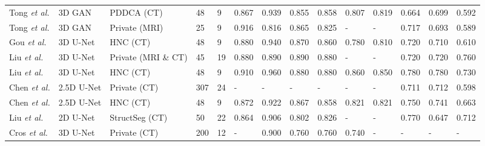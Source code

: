 \documentclass[lettersize,journal]{IEEEtran}
\begin{document}
{\begin{table*}[ht!]
{\begin{tabular}{@{}llllllllllllll@{}}
Tong {\it{et al.}} \cite{41}                     & 3D GAN                    & PDDCA (CT) \cite{30}   & 48       & 9          & 0.867     & 0.939    & 0.855           & 0.858           & 0.807              & 0.819              & 0.664          & 0.699          & 0.592  \\
Tong {\it{et al.}} \cite{41}                     & 3D GAN                    & Private (MRI)         & 25       & 9          & 0.916     & 0.816    & 0.865           & 0.825           & -                  & -                  & 0.717          & 0.693          & 0.589  \\
Gou {\it{et al.}} \cite{42}                       & 3D U-Net                  & HNC (CT) \cite{30}     & 48       & 9          & 0.880     & 0.940    & 0.870           & 0.860           & 0.780              & 0.810              & 0.720          & 0.710          & 0.610  \\
Liu {\it{et al.}} \cite{43}                       & 3D U-Net                  & Private (MRI \& CT)   & 45       & 19         & 0.880     & 0.890    & 0.890           & 0.880           & -                  & -                  & 0.720          & 0.720          & 0.760  \\
Liu {\it{et al.}} \cite{43}                       & 3D U-Net                  & HNC (CT) \cite{30}     & 48       & 9          & 0.910     & 0.960    & 0.880           & 0.880           & 0.860              & 0.850              & 0.780          & 0.780          & 0.730  \\
Chen {\it{et al.}} \cite{44}                     & 2.5D U-Net                & Private (CT)          & 307      & 24         & -         & -        & -               & -               & -                  & -                  & 0.711          & 0.712          & 0.598  \\
Chen {\it{et al.}} \cite{44}                      & 2.5D U-Net                & HNC (CT) \cite{30}     & 48       & 9          & 0.872     & 0.922    & 0.867           & 0.858           & 0.821              & 0.821              & 0.750          & 0.741          & 0.663  \\
Liu {\it{et al.}} \cite{45}                      & 2D U-Net                  & StructSeg (CT)        & 50       & 22         & 0.864     & 0.906    & 0.802           & 0.826           & -                  & -                  & 0.770          & 0.647          & 0.712  \\
Cros {\it{et al.}} \cite{46}                     & 3D U-Net                  & Private (CT)          & 200      & 12         & -         & 0.900    & 0.760           & 0.760           & 0.740              & -                  & -              & -              & -      \\

\end{tabular}}
\end{table*}}
\end{document}
